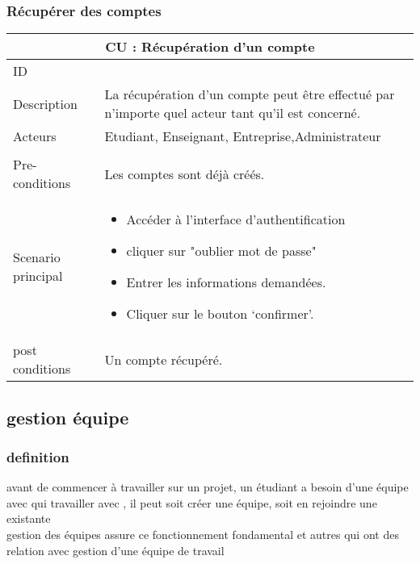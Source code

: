 \documentclass[11pt,fleqn]{book} %
\begin{document}
\subsubsection{Récupérer des comptes}
\begin{center}
\begin{tabularx}{1\textwidth} { | p{4cm} | >{\raggedright\arraybackslash}X |  }
  \hline
  \multicolumn{2}{|c|}{CU : Récupération d’un compte} \\
 \hline
 ID & 4  \\
 \hline
 Description  &  La récupération d’un compte peut être effectué par n’importe quel acteur tant qu’il est concerné.   \\
  \hline
 Acteurs  & Etudiant, Enseignant, Entreprise,Administrateur   \\
  \hline   \\
 Pre-conditions  & Les comptes sont déjà créés.  \\
  \hline
 Scenario principal  & 
 \begin{itemize}
     \item Accéder à l'interface d’authentification 
     \item cliquer sur "oublier mot de passe"
     \item Entrer les informations demandées.
     \item Cliquer sur le bouton ‘confirmer’.

 \end{itemize}\\
  \hline
 post conditions  &  Un compte récupéré.  \\
  \hline
\end{tabularx}
\label{tbl:nicetablelesstable}
\end{center}
\newpage
\subsection{gestion équipe}

\subsubsection{definition}
avant de commencer à travailler sur un projet, un étudiant a besoin d'une équipe avec qui travailler avec , il peut soit créer une équipe, soit en rejoindre une existante \\
gestion des équipes assure ce fonctionnement fondamental et autres qui ont des relation avec gestion d'une équipe de travail
\end{document}
